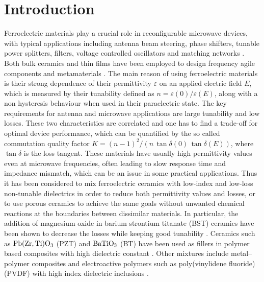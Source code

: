 \documentclass[%
 aip,
 amsmath,amssymb,
 reprint,%
linenumbers
]{revtex4-1}
\newcommand{\co}[1]{\textcolor{correction}{#1}}
\begin{document}
 \section{Introduction}
 Ferroelectric materials play a crucial role in reconfigurable
 microwave devices, with typical applications including antenna beam steering,
 phase shifters, tunable power splitters, filters, voltage controlled oscillators and
 matching networks \cite{tagantsev_ferroelectric_2018}. Both bulk ceramics and thin films have
 been employed to design frequency agile components \cite{vendik_ferroelectric_1999,
 lancaster_thin-film_1998,xi_oxide_2000} and metamaterials \cite{hand_frequency_2008, zhao_experimental_2008}.
 The main reason of using
 ferroelectric materials is their strong dependence of their permittivity $\varepsilon$
 on an applied electric field $E$, which is measured by their tunability defined as $n = \varepsilon(0)/\varepsilon(E)$,
 along with a non hysteresis behaviour when used in their paraelectric state.
 The key requirements for antenna and microwave applications are large tunability and low losses.
 These two characteristics are correlated and one has to find a trade-off for optimal
  device performance, which can be quantified by the so called commutation quality factor
 $K = (n -1)^2/(n\, \tan\delta(0)\,\tan\delta(E))$, where $\tan\delta$ is the loss tangent. 
 These materials have usually high permittivity values even at microwave frequencies,
 often leading to slow response time and impedance mismatch, which can be an issue in some practical
 applications. Thus it has been considered to mix ferroelectric \co{ceramics with} low-index and
 low-loss non-tunable dielectrics in order to reduce both permittivity values and losses, or to
 use porous ceramics to achieve the same goals without unwanted chemical reactions at the boundaries between dissimilar materials. \co{In particular, the addition of magnesium oxide in barium strontium titanate (BST) ceramics have been shown to decrease the losses while keeping good tunability \cite{irvin_three-dimensional_2005,chung_low-losses_2008}. Ceramics
 such as $\rm Pb(Zr,Ti)O_3$ (PZT) and $\rm BaTiO_3$ (BT) have been used as fillers in polymer
 based composites with high dielectric constant \cite{wang_piezoelectric_2012}. Other mixtures include metal–polymer composites \cite{li_ferroelectric_2013}
 and electroactive polymers such as poly(vinylidene fluoride) (PVDF) with high index dielectric inclusions \cite{hu_preparation_2015}.
 }
\end{document}
